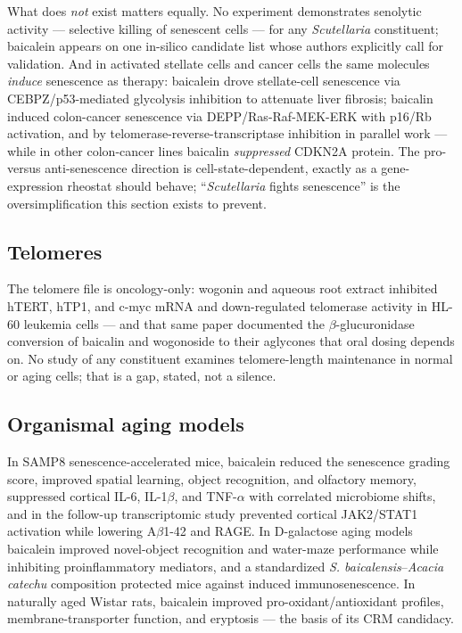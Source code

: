 What does \emph{not} exist matters equally. No experiment demonstrates senolytic activity --- selective killing of senescent cells --- for any \textit{Scutellaria} constituent; baicalein appears on one in-silico candidate list whose authors explicitly call for validation. And in activated stellate cells and cancer cells the same molecules \emph{induce} senescence as therapy: baicalein drove stellate-cell senescence via CEBPZ/p53-mediated glycolysis inhibition to attenuate liver fibrosis; baicalin induced colon-cancer senescence via DEPP/Ras-Raf-MEK-ERK with p16/Rb activation, and by telomerase-reverse-transcriptase inhibition in parallel work --- while in other colon-cancer lines baicalin \emph{suppressed} CDKN2A protein. The pro- versus anti-senescence direction is cell-state-dependent, exactly as a gene-expression rheostat should behave; ``\textit{Scutellaria} fights senescence'' is the oversimplification this section exists to prevent.

\subsection{Telomeres}

The telomere file is oncology-only: wogonin and aqueous root extract inhibited hTERT, hTP1, and c-myc mRNA and down-regulated telomerase activity in HL-60 leukemia cells --- and that same paper documented the $\beta$-glucuronidase conversion of baicalin and wogonoside to their aglycones that oral dosing depends on. No study of any constituent examines telomere-length maintenance in normal or aging cells; that is a gap, stated, not a silence.

\subsection{Organismal aging models}

In SAMP8 senescence-accelerated mice, baicalein reduced the senescence grading score, improved spatial learning, object recognition, and olfactory memory, suppressed cortical IL-6, IL-1$\beta$, and TNF-$\alpha$ with correlated microbiome shifts, and in the follow-up transcriptomic study prevented cortical JAK2/STAT1 activation while lowering A$\beta$1-42 and RAGE. In D-galactose aging models baicalein improved novel-object recognition and water-maze performance while inhibiting proinflammatory mediators, and a standardized \textit{S. baicalensis}--\textit{Acacia catechu} composition protected mice against induced immunosenescence. In naturally aged Wistar rats, baicalein improved pro-oxidant/antioxidant profiles, membrane-transporter function, and eryptosis --- the basis of its CRM candidacy.

